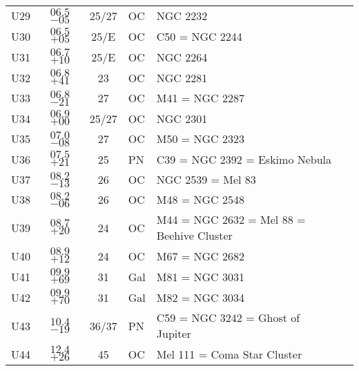 \begin{table}[p]
\begin{tabular}{lcclll}
U29 &$06.5$ $-05$&25/27&OC &NGC 2232\\
U30 &$06.5$ $+05$&25/E&OC &C50 = NGC 2244\\
U31 &$06.7$ $+10$&25/E&OC &NGC 2264\\
U32 &$06.8$ $+41$&23&OC &NGC 2281\\
U33 &$06.8$ $-21$&27&OC &M41 = NGC 2287\\
U34 &$06.9$ $+00$&25/27&OC &NGC 2301\\
U35 &$07.0$ $-08$&27&OC &M50 = NGC 2323\\
U36 &$07.5$ $+21$&25&PN &C39 = NGC 2392 = Eskimo Nebula\\
U37 &$08.2$ $-13$&26&OC &NGC 2539 = Mel 83\\
U38 &$08.2$ $-06$&26&OC &M48 = NGC 2548\\
U39 &$08.7$ $+20$&24&OC &M44 = NGC 2632 = Mel 88 = Beehive Cluster\\
U40 &$08.9$ $+12$&24&OC &M67 = NGC 2682\\
U41 &$09.9$ $+69$&31&Gal&M81 = NGC 3031\\
U42 &$09.9$ $+70$&31&Gal&M82 = NGC 3034\\
U43 &$10.4$ $-19$&36/37&PN &C59 = NGC 3242 = Ghost of Jupiter\\
U44 &$12.4$ $+26$&45&OC &Mel 111 = Coma Star Cluster\\
\hline
\end{tabular}
\end{table}
\clearpage

